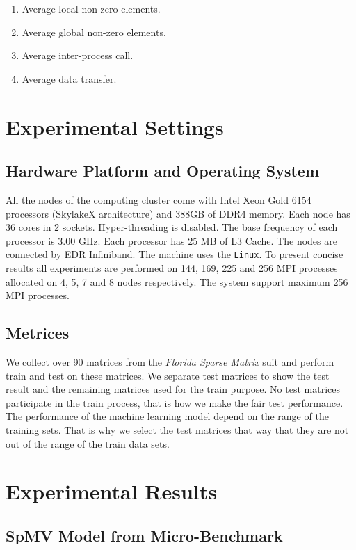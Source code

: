 \documentclass[conference, 10ppt]{IEEEtran}
\begin{document}
\begin{enumerate}
\item Average local non-zero elements.
\item Average global non-zero elements.
\item Average inter-process call.
\item Average data transfer.
\end{enumerate}

\section{Experimental Settings}
\subsection{Hardware Platform and Operating System}
All the nodes of the computing cluster come with Intel Xeon Gold
6154 processors (SkylakeX architecture) and 388GB of DDR4
memory. Each node has 36 cores in 2 sockets. Hyper-threading is
disabled. The base frequency of each processor is 3.00 GHz.  Each
processor has 25 MB of L3 Cache. The nodes are connected by EDR
Infiniband. The machine uses the \texttt{Linux}. To present
concise results all experiments are performed on 144, 169, 225 and 256 MPI processes
allocated on 4, 5, 7 and 8 nodes respectively. The system support maximum 256 MPI processes.

\subsection{Metrices}
We collect over 90 matrices from the \textit{Florida Sparse Matrix} suit 
and perform train and test on these matrices. We separate test matrices 
to show the test result and the remaining matrices used for the train purpose. 
No test matrices participate in the train process, that is how we make the 
fair test performance. The performance of the machine learning model depend 
on the range of the training sets. That is why we select the test matrices 
that way that they are not out of the range of the train data sets. 

\section{Experimental Results}
\subsection{SpMV Model from Micro-Benchmark}
\end{document}
